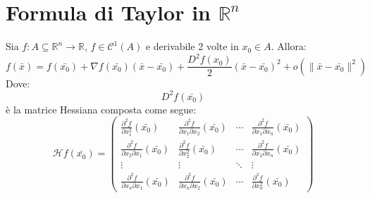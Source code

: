 \documentclass[a4paper,12pt,openright]{book}
\begin{document}
    
    \section{Formula di Taylor in $\mathbb{R}^n$}
    
    Sia $f : A \subseteq \mathbb{R}^n \to \mathbb{R}$, $f \in \mathcal{C}^1(A)$ e derivabile 2 volte in $x_0 \in A$.
    Allora:
    \[f(\bar{x}) = f(\bar{x_0}) + \nabla f(\bar{x_0})(\bar{x} - \bar{x_0}) + \frac{D^2f(x_0)}{2}(\bar{x} - \bar{x_0})^2 + o(\|\bar{x} - \bar{x_0}\|^2)\]
    Dove:
    \[D^2f(\bar{x_0})\]
    è la matrice Hessiana composta come segue:
    \[
    \renewcommand{\arraystretch}{2} %
    \mathcal{H}f(\bar{x_0}) =
    \begin{pmatrix}
    	\frac{\partial^2 f}{\partial x_1^2}(\bar{x_0}) & \frac{\partial^2 f}{\partial x_1 \partial x_2}(\bar{x_0}) & \cdots & \frac{\partial^2 f}{\partial x_1 \partial x_n}(\bar{x_0}) \\
    	\frac{\partial^2 f}{\partial x_2 \partial x_1}(\bar{x_0}) & \frac{\partial^2 f}{\partial x_2^2}(\bar{x_0}) & \cdots & \frac{\partial^2 f}{\partial x_2 \partial x_n}(\bar{x_0}) \\
    	\vdots & \vdots & \ddots & \vdots \\
    	\frac{\partial^2 f}{\partial x_n \partial x_1}(\bar{x_0}) & \frac{\partial^2 f}{\partial x_n \partial x_2}(\bar{x_0}) & \cdots & \frac{\partial^2 f}{\partial x_n^2}(\bar{x_0})
    \end{pmatrix}
    \]
	
\end{document}

